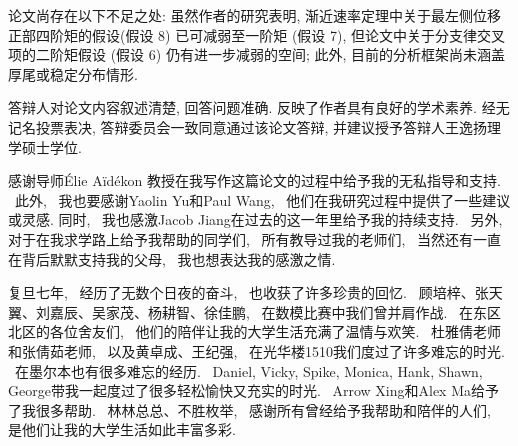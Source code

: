 \documentclass[type=master]{fduthesis}
\newtheorem[
  sibling={},
  header-font=\normalfont\bilingual{\bfseries\upshape}{\sffamily}, 
  body-font=\normalfont\mdseries\bilingual{\itshape}{\upshape},
  head-format={\NAME\,\NUMBER\NOTE},
  note-brace-left={\mdseries\upshape(},
  note-brace-right={\mdseries\upshape)},
]{assumption}{\bilingual{Assumption}{假设}}
\begin{document}
    论文尚存在以下不足之处: 虽然作者的研究表明, 渐近速率定理中关于最左侧位移正部四阶矩的假设(假设 8) 已可减弱至一阶矩 (假设 7), 但论文中关于分支律交叉项的二阶矩假设 (假设 6) 仍有进一步减弱的空间; 此外, 目前的分析框架尚未涵盖厚尾或稳定分布情形.

    答辩人对论文内容叙述清楚, 回答问题准确. 反映了作者具有良好的学术素养. 经无记名投票表决, 答辩委员会一致同意通过该论文答辩, 并建议授予答辩人王逸扬理学硕士学位. 
\else
    \begin{acknowledgements}

        感谢导师\'Elie A\"id\'ekon 教授在我写作这篇论文的过程中给予我的无私指导和支持. ~此外,~ 我也要感谢Yaolin Yu和Paul Wang,~ 他们在我研究过程中提供了一些建议或灵感. 同时,~ 我也感激Jacob Jiang在过去的这一年里给予我的持续支持. ~另外,~ 对于在我求学路上给予我帮助的同学们,~ 所有教导过我的老师们,~ 当然还有一直在背后默默支持我的父母, ~我也想表达我的感激之情.

        复旦七年,~ 经历了无数个日夜的奋斗,~ 也收获了许多珍贵的回忆. ~顾培梓、张天翼、刘嘉辰、吴家茂、杨耕智、徐佳鹏,~ 在数模比赛中我们曾并肩作战. ~在东区北区的各位舍友们,~ 他们的陪伴让我的大学生活充满了温情与欢笑. ~杜雅倩老师和张倩茹老师,~ 以及黄卓成、王纪强,~ 在光华楼1510我们度过了许多难忘的时光. ~在墨尔本也有很多难忘的经历. ~Daniel, Vicky, Spike, Monica, Hank, Shawn, George带我一起度过了很多轻松愉快又充实的时光. ~Arrow Xing和Alex Ma给予了我很多帮助. ~林林总总、不胜枚举,~ 感谢所有曾经给予我帮助和陪伴的人们,~ 是他们让我的大学生活如此丰富多彩.







\end{acknowledgements}
\end{document}

